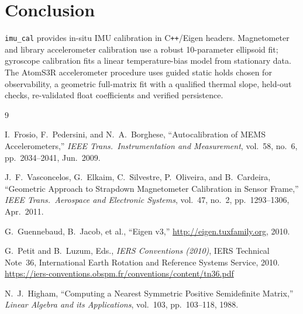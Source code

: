\documentclass[conference]{IEEEtran}
\begin{document}
    \section{Conclusion}

    \texttt{imu\_cal} provides in-situ IMU calibration in C\texttt{++}/Eigen
    headers. Magnetometer and library accelerometer calibration use a
    robust 10-parameter ellipsoid fit; gyroscope calibration fits a linear
    temperature-bias model from stationary data. The AtomS3R accelerometer
    procedure uses guided static holds chosen for observability, a geometric
    full-matrix fit with a qualified thermal slope, held-out checks,
    re-validated float coefficients and verified persistence.

    \begin{thebibliography}{9}

        I.~Frosio, F.~Pedersini, and N.~A.~Borghese,
        ``Autocalibration of MEMS Accelerometers,''
        \emph{IEEE Trans.\ Instrumentation and Measurement},
        vol.~58, no.~6, pp.~2034--2041, Jun.\ 2009.

        J.~F.~Vasconcelos, G.~Elkaim, C.~Silvestre, P.~Oliveira, and B.~Cardeira,
        ``Geometric Approach to Strapdown Magnetometer Calibration in Sensor Frame,''
        \emph{IEEE Trans.\ Aerospace and Electronic Systems},
        vol.~47, no.~2, pp.~1293--1306, Apr.\ 2011.

        G.~Guennebaud, B.~Jacob, et al.,
        ``Eigen v3,''
        \url{http://eigen.tuxfamily.org}, 2010.

        G.~Petit and B.~Luzum, Eds.,
        \emph{IERS Conventions (2010)}, IERS Technical Note~36,
        International Earth Rotation and Reference Systems Service,
        2010. \url{https://iers-conventions.obspm.fr/conventions/content/tn36.pdf}

        N.~J.~Higham,
        ``Computing a Nearest Symmetric Positive Semidefinite Matrix,''
        \emph{Linear Algebra and its Applications},
        vol.~103, pp.~103--118, 1988.

    \end{thebibliography}
\end{document}
